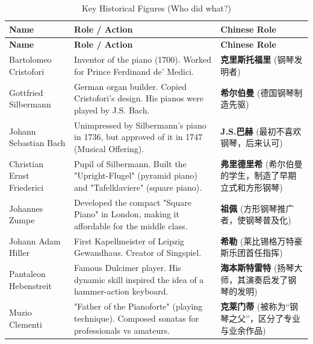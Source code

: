 \documentclass[math,code]{amznotes}
\theoremstyle{remark}
\begin{document}
\begin{longtable}{p{} p{} p{}}
\caption{Key Historical Figures (Who did what?)} \\
\toprule
\textbf{Name} & \textbf{Role / Action} & \textbf{Chinese Role} \\
\midrule
\endfirsthead

\toprule
\textbf{Name} & \textbf{Role / Action} & \textbf{Chinese Role} \\
\midrule
\endhead

\bottomrule
\endfoot

Bartolomeo Cristofori & Inventor of the piano (1700). Worked for Prince Ferdinand de' Medici. & \textbf{克里斯托福里} (钢琴发明者) \\
\midrule
Gottfried Silbermann & German organ builder. Copied Cristofori's design. His pianos were played by J.S. Bach. & \textbf{希尔伯曼} (德国钢琴制造先驱) \\
\midrule
Johann Sebastian Bach & Unimpressed by Silbermann's piano in 1736, but approved of it in 1747 (Musical Offering). & \textbf{J.S.巴赫} (最初不喜欢钢琴，后来认可) \\
\midrule
Christian Ernst Friederici & Pupil of Silbermann. Built the "Upright-Flugel" (pyramid piano) and "Tafelklaviere" (square piano). & \textbf{弗里德里希} (希尔伯曼的学生，制造了早期立式和方形钢琴) \\
\midrule
Johannes Zumpe & Developed the compact "Square Piano" in London, making it affordable for the middle class. & \textbf{祖佩} (方形钢琴推广者，使钢琴普及化) \\
\midrule
Johann Adam Hiller & First Kapellmeister of Leipzig Gewandhaus. Creator of Singspiel. & \textbf{希勒} (莱比锡格万特豪斯乐团首任指挥) \\
\midrule
Pantaleon Hebenstreit & Famous Dulcimer player. His dynamic skill inspired the idea of a hammer-action keyboard. & \textbf{海本斯特雷特} (扬琴大师，其演奏启发了钢琴的发明) \\
\midrule
Muzio Clementi & "Father of the Pianoforte" (playing technique). Composed sonatas for professionals vs amateurs. & \textbf{克莱门蒂} (被称为“钢琴之父”，区分了专业与业余作品) \\
\end{longtable}
\end{document}

